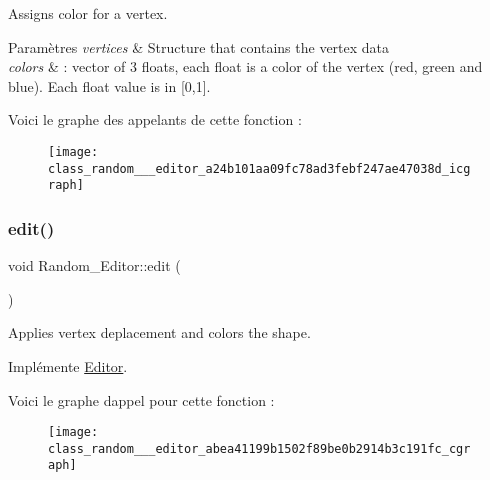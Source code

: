 Assigns color for a vertex. 


\begin{DoxyParams}{Paramètres}
{\em vertices} & Structure that contains the vertex data \\
\hline
{\em colors} & \+: vector of 3 floats, each float is a color of the vertex (red, green and blue). Each float value is in \mbox{[}0,1\mbox{]}. \\
\hline
\end{DoxyParams}
Voici le graphe des appelants de cette fonction \+:\nopagebreak
\begin{figure}[H]
\begin{center}
\leavevmode
\texttt{[image: class\_random\_\_\_editor\_a24b101aa09fc78ad3febf247ae47038d\_icgraph]}
\end{center}
\end{figure}
\mbox{\label{class_random___editor_abea41199b1502f89be0b2914b3c191fc}} 
\subsubsection{\texorpdfstring{edit()}{edit()}}
{\footnotesize\ttfamily void Random\+\_\+\+Editor\+::edit (\begin{DoxyParamCaption}{ }\end{DoxyParamCaption})\hspace{0.3cm}{\ttfamily [virtual]}}



Applies vertex deplacement and colors the shape. 



Implémente \hyperlink{class_editor_abca97ba11536c494a0c26bac77917792}{Editor}.

Voici le graphe d\textquotesingle{}appel pour cette fonction \+:
\nopagebreak
\begin{figure}[H]
\begin{center}
\leavevmode
\texttt{[image: class\_random\_\_\_editor\_abea41199b1502f89be0b2914b3c191fc\_cgraph]}
\end{center}
\end{figure}
\mbox{\label{class_random___editor_aa194991b2926aeab96ad5470f549f087}} 

